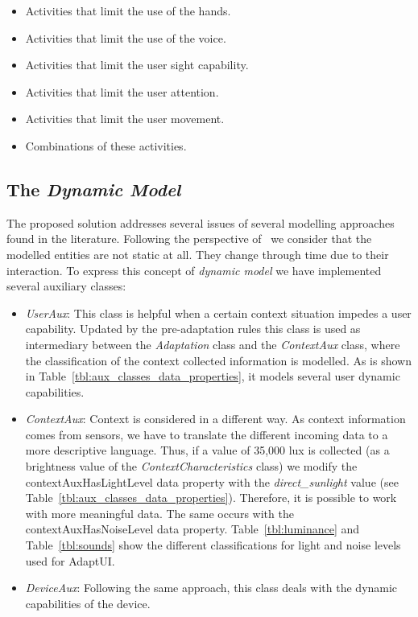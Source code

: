 \begin{itemize}
 \item Activities that limit the use of the hands.
 \item Activities that limit the use of the voice.
 \item Activities that limit the user sight capability.
 \item Activities that limit the user attention.
 \item Activities that limit the user movement.
 \item Combinations of these activities.
\end{itemize}

\subsection{The \textit{Dynamic Model}}
\label{sec:dynamic_model}

The proposed solution addresses several issues of several modelling approaches
found in the literature. Following the perspective of~\citet{fischer_user_2001}
we consider that the modelled entities are not static at all. They change through
time due to their interaction. To express this concept of \textit{dynamic model}
we have implemented several auxiliary classes:

\begin{itemize}
 \item \textit{UserAux}: This class is helpful when a certain context situation
 impedes a user capability. Updated by the pre-adaptation rules this class is used
 as intermediary between the \textit{Adaptation} class and the \textit{ContextAux}
 class, where the classification of the context collected information is modelled.
 As is shown in Table~\ref{tbl:aux_classes_data_properties}, it models several user
 dynamic capabilities.
 
 \item \textit{ContextAux}: Context is considered in a different way. As context
 information comes from sensors, we have to translate the different incoming data
 to a more descriptive language. Thus, if a value of 35,000 lux is collected (as
 a brightness value of the \textit{ContextCharacteristics} class) we modify the
 contextAuxHasLightLevel data property with the \textit{direct\_sunlight} value (see
 Table~\ref{tbl:aux_classes_data_properties}). Therefore, it is possible to work
 with more meaningful data. The same occurs with the contextAuxHasNoiseLevel
 data property. Table~\ref{tbl:luminance} and Table~\ref{tbl:sounds} show the
 different classifications for light and noise levels used for AdaptUI.
 
 \item \textit{DeviceAux}: Following the same approach, this class deals with the
 dynamic capabilities of the device.
\end{itemize}

